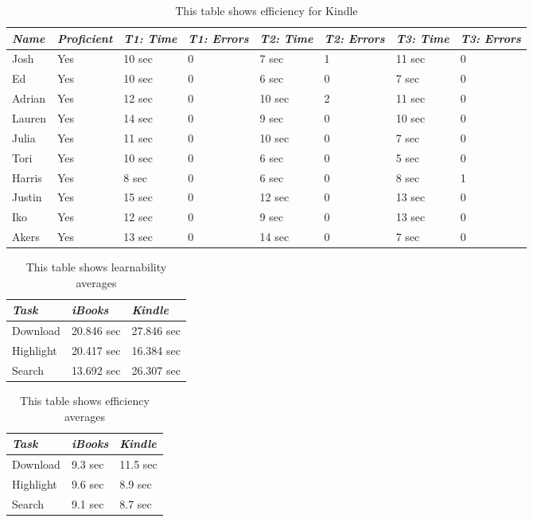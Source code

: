 \documentclass[12pt,letterpaper]{article}
\begin{document}
    \begin{table}
        \centering
        \begin{tabular}{|l|l|l|l|l|l|l|l|}
            \hline
            \emph{Name} & \emph{Proficient} & \emph{T1: Time} & \emph{T1: Errors} & \emph{T2: Time} & \emph{T2: Errors} & \emph{T3: Time} & \emph{T3: Errors} \\
            \hline
            Josh & Yes & 10 sec & 0 & 7 sec & 1 & 11 sec & 0 \\
            \hline
            Ed & Yes & 10 sec & 0 & 6 sec & 0 & 7 sec & 0 \\
            \hline
            Adrian & Yes & 12 sec & 0 & 10 sec & 2 & 11 sec & 0 \\
            \hline
            Lauren & Yes & 14 sec & 0 & 9 sec & 0 & 10 sec & 0 \\
            \hline
            Julia & Yes & 11 sec & 0 & 10 sec & 0 & 7 sec & 0 \\
            \hline
            Tori & Yes & 10 sec & 0 & 6 sec & 0 & 5 sec & 0 \\
            \hline
            Harris & Yes & 8 sec & 0 & 6 sec & 0 & 8 sec & 1 \\
            \hline
            Justin & Yes & 15 sec & 0 & 12 sec & 0 & 13 sec & 0 \\
            \hline
            Iko & Yes & 12 sec & 0 & 9 sec & 0 & 13 sec & 0 \\
            \hline
            Akers & Yes & 13 sec & 0 & 14 sec & 0 & 7 sec & 0 \\
        \end{tabular}
        \caption{This table shows efficiency for Kindle}
    \end{table}

    \begin{table}
        \centering
        \begin{tabular}{|l||l|l|}
            \hline
            \emph{Task} & \emph{iBooks} & \emph{Kindle} \\
            \hline
            Download & 20.846 sec & 27.846 sec \\
            \hline
            Highlight & 20.417 sec & 16.384 sec \\
            \hline
            Search & 13.692 sec & 26.307 sec \\
        \end{tabular}
        \caption{This table shows learnability averages}
    \end{table}

    \begin{table}
        \centering
        \begin{tabular}{|l||l|l|}
            \hline
            \emph{Task} & \emph{iBooks} & \emph{Kindle} \\
            \hline
            Download & 9.3 sec & 11.5 sec \\
            \hline
            Highlight & 9.6 sec & 8.9 sec \\
            \hline
            Search & 9.1 sec & 8.7 sec \\
        \end{tabular}
        \caption{This table shows efficiency averages}
    \end{table}
\end{document}
